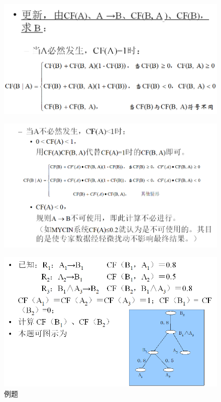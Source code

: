 \documentclass[UTF8,a4paper]{ctexart}
\begin{document}
\begin{figure}[H]
	\centering
	\includegraphics[scale = 0.5]{assets/ArtificialIntelligence/2018-01-09-00-28-10.png}
\end{figure}

\begin{figure}[H]
	\centering
	\includegraphics[scale = 0.5]{assets/ArtificialIntelligence/2018-01-09-00-28-36.png}
\end{figure}

\begin{figure}[H]
	\centering
	\includegraphics[scale = 0.5]{assets/ArtificialIntelligence/2018-01-09-00-29-14.png}
	\caption{例题}
\end{figure}
\end{document}
